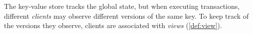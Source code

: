 The key-value store tracks the global state, 
but when executing transactions, different \emph{clients} may observe 
different versions of the same key. To keep track of 
the versions they observe, clients are associated with \emph{views} (\cref{def:view}). 



